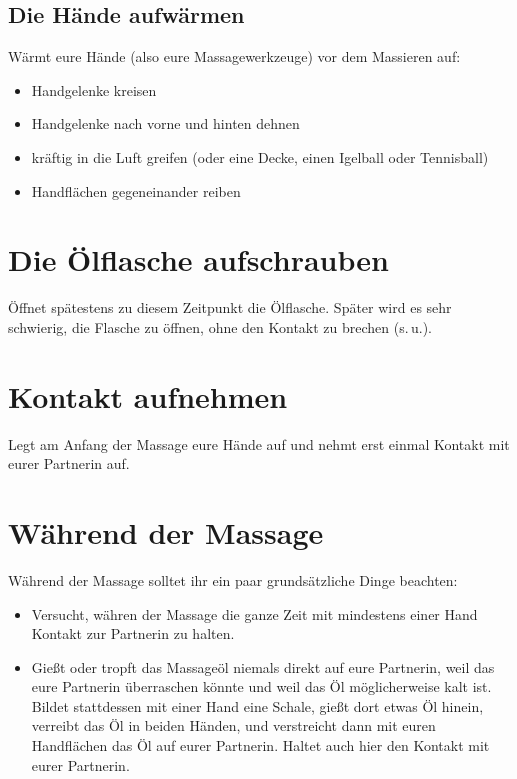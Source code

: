 \subsection{Die Hände aufwärmen}

Wärmt eure Hände (also eure Massagewerkzeuge) vor dem Massieren auf:

\begin{itemize}
  \item Handgelenke kreisen
  \item Handgelenke nach vorne und hinten dehnen
  \item kräftig in die Luft greifen (oder eine Decke, einen Igelball oder Tennisball)
  \item Handflächen gegeneinander reiben
\end{itemize}


\section{Die Ölflasche aufschrauben}

Öffnet spätestens zu diesem Zeitpunkt die Ölflasche. Später wird es sehr schwierig, die Flasche zu öffnen, ohne den Kontakt zu brechen (s.\,u.).

\section{Kontakt aufnehmen}

Legt am Anfang der Massage eure Hände auf und nehmt erst einmal Kontakt mit eurer Partnerin auf.


\section{Während der Massage}

Während der Massage solltet ihr ein paar grundsätzliche Dinge beachten:

\begin{itemize}
  \item Versucht, währen der Massage die ganze Zeit mit mindestens einer Hand Kontakt zur Partnerin zu halten.
  \item Gießt oder tropft das Massageöl niemals direkt auf eure Partnerin, weil das eure Partnerin überraschen könnte und weil das Öl möglicherweise kalt ist. Bildet stattdessen mit einer Hand eine Schale, gießt dort etwas Öl hinein, verreibt das Öl in beiden Händen, und verstreicht dann mit euren Handflächen das Öl auf eurer Partnerin. Haltet auch hier den Kontakt mit eurer Partnerin.
\end{itemize}


